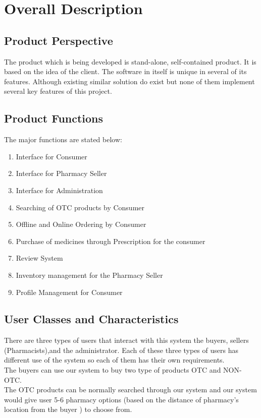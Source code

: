 \documentclass{scrreprt}
\begin{document}
\chapter{Overall Description}

\section{Product Perspective}
The product which is being developed is stand-alone, self-contained product. It is based on the idea of the client. The software in itself is unique in several of its features. Although existing similar solution do exist but none of them implement several key features of this project.

\section{Product Functions}
The major functions are stated below:
\begin{enumerate}
\item	Interface for Consumer
\item	Interface for Pharmacy Seller
\item	Interface for Administration
\item	Searching of OTC products by Consumer
\item	Offline and Online Ordering by Consumer
\item	Purchase of medicines through Prescription for the consumer
\item	Review System
\item	Inventory management for the Pharmacy Seller
\item	Profile Management for Consumer
\end{enumerate}

\section{User Classes and Characteristics}

There are three types of users that interact with this system the buyers, sellers (Pharmacists),and the administrator. Each of these three types of users has different use of the system so each of them has their own requirements.   \\

 The buyers can use our system to buy two type of products OTC and NON-OTC.   \\

 The OTC products can be normally searched through our system and our system would give user 5-6 pharmacy options (based on the distance of pharmacy’s location from the buyer ) to choose from.     \\
\end{document}
